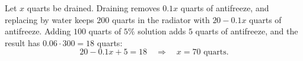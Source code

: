 Let $x$ quarts be drained. Draining removes $0.1x$ quarts of antifreeze, and replacing by water keeps $200$ quarts in the radiator with $20-0.1x$ quarts of antifreeze. Adding $100$ quarts of $5\%$ solution adds $5$ quarts of antifreeze, and the result has $0.06\cdot300=18$ quarts:
\[
20-0.1x+5=18\quad\Longrightarrow\quad x=\boxed{70}\text{ quarts}.
\]
